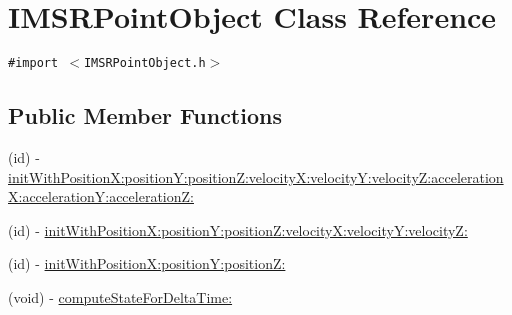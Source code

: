\hypertarget{interface_i_m_s_r_point_object}{
\section{IMSRPointObject Class Reference}
\label{interface_i_m_s_r_point_object}
}
{\tt \#import $<$IMSRPointObject.h$>$}

\subsection*{Public Member Functions}
\begin{CompactItemize}
\item 
(id) - \hyperlink{interface_i_m_s_r_point_object_fd0ee01d2e6b9446c31b836b3acface1}{initWithPositionX:positionY:positionZ:velocityX:velocityY:velocityZ:accelerationX:accelerationY:accelerationZ:}
\item 
(id) - \hyperlink{interface_i_m_s_r_point_object_9e6718287d2f983b1e710799f70be810}{initWithPositionX:positionY:positionZ:velocityX:velocityY:velocityZ:}
\item 
(id) - \hyperlink{interface_i_m_s_r_point_object_552bfa41162162288ccd39c6a0126e7b}{initWithPositionX:positionY:positionZ:}
\item 
(void) - \hyperlink{interface_i_m_s_r_point_object_5b40a3863dafb9a433c7f29ce347de9d}{computeStateForDeltaTime:}
\end{CompactItemize}

